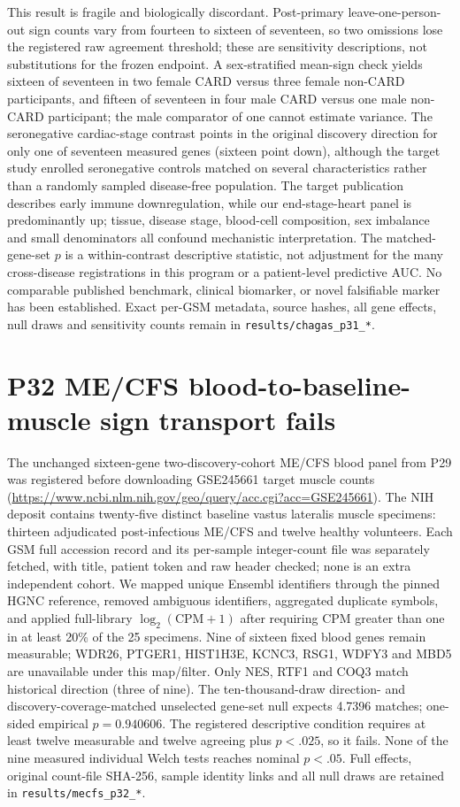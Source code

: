 \documentclass[11pt,a4paper]{article}
\begin{document}
This result is fragile and biologically discordant. Post-primary leave-one-person-out sign counts vary from fourteen to sixteen of seventeen, so two omissions lose the registered raw agreement threshold; these are sensitivity descriptions, not substitutions for the frozen endpoint. A sex-stratified mean-sign check yields sixteen of seventeen in two female CARD versus three female non-CARD participants, and fifteen of seventeen in four male CARD versus one male non-CARD participant; the male comparator of one cannot estimate variance. The seronegative cardiac-stage contrast points in the original discovery direction for only one of seventeen measured genes (sixteen point down), although the target study enrolled seronegative controls matched on several characteristics rather than a randomly sampled disease-free population. The target publication describes early immune downregulation, while our end-stage-heart panel is predominantly up; tissue, disease stage, blood-cell composition, sex imbalance and small denominators all confound mechanistic interpretation. The matched-gene-set $p$ is a within-contrast descriptive statistic, not adjustment for the many cross-disease registrations in this program or a patient-level predictive AUC. No comparable published benchmark, clinical biomarker, or novel falsifiable marker has been established. Exact per-GSM metadata, source hashes, all gene effects, null draws and sensitivity counts remain in \texttt{results/chagas\_p31\_*}.

\section{P32 ME/CFS blood-to-baseline-muscle sign transport fails}
The unchanged sixteen-gene two-discovery-cohort ME/CFS blood panel from P29 was registered before downloading GSE245661 target muscle counts (\url{https://www.ncbi.nlm.nih.gov/geo/query/acc.cgi?acc=GSE245661}). The NIH deposit contains twenty-five distinct baseline vastus lateralis muscle specimens: thirteen adjudicated post-infectious ME/CFS and twelve healthy volunteers. Each GSM full accession record and its per-sample integer-count file was separately fetched, with title, patient token and raw header checked; none is an extra independent cohort. We mapped unique Ensembl identifiers through the pinned HGNC reference, removed ambiguous identifiers, aggregated duplicate symbols, and applied full-library $\log_2(\mathrm{CPM}+1)$ after requiring CPM greater than one in at least 20\% of the 25 specimens. Nine of sixteen fixed blood genes remain measurable; WDR26, PTGER1, HIST1H3E, KCNC3, RSG1, WDFY3 and MBD5 are unavailable under this map/filter. Only NES, RTF1 and COQ3 match historical direction (three of nine). The ten-thousand-draw direction- and discovery-coverage-matched unselected gene-set null expects 4.7396 matches; one-sided empirical $p=0.940606$. The registered descriptive condition requires at least twelve measurable and twelve agreeing plus $p<.025$, so it fails. None of the nine measured individual Welch tests reaches nominal $p<.05$. Full effects, original count-file SHA-256, sample identity links and all null draws are retained in \texttt{results/mecfs\_p32\_*}.
\end{document}
